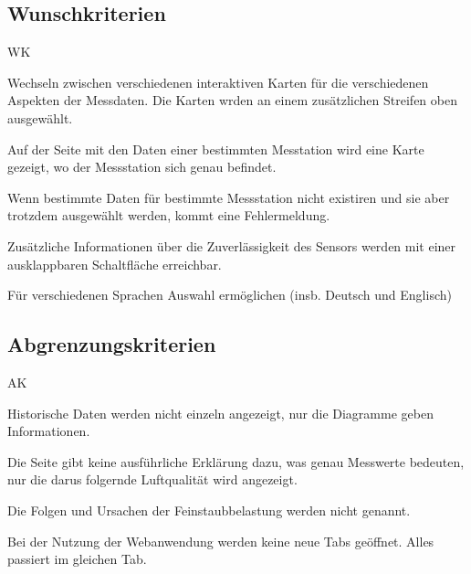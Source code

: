 \newpage
\subsection{Wunschkriterien}
\begin{Kriterien}{WK}

	\item Wechseln zwischen verschiedenen interaktiven Karten für die verschiedenen Aspekten der Messdaten. Die Karten wrden an einem zusätzlichen Streifen oben ausgewählt.

	\item Auf der Seite mit den Daten einer bestimmten Messtation wird eine Karte gezeigt, wo der Messstation sich genau befindet. 

	\item Wenn bestimmte Daten für bestimmte Messstation nicht existiren und sie aber trotzdem ausgewählt werden, kommt eine Fehlermeldung.

	\item Zusätzliche Informationen über die Zuverlässigkeit des Sensors werden mit einer ausklappbaren Schaltfläche erreichbar.

	\item Für verschiedenen Sprachen Auswahl ermöglichen (insb. Deutsch und Englisch)

\end{Kriterien}

\subsection{Abgrenzungskriterien}
\begin{Kriterien}{AK}

	\item Historische Daten werden nicht einzeln angezeigt, nur die Diagramme geben Informationen.
	
	\item Die Seite gibt keine ausführliche Erklärung dazu, was  genau Messwerte bedeuten, nur die darus folgernde Luftqualität wird angezeigt. 
	
	\item Die Folgen und Ursachen der Feinstaubbelastung werden nicht genannt.
	
	\item Bei der Nutzung der Webanwendung werden keine neue Tabs geöffnet. Alles passiert im gleichen Tab.
	
\end{Kriterien}
